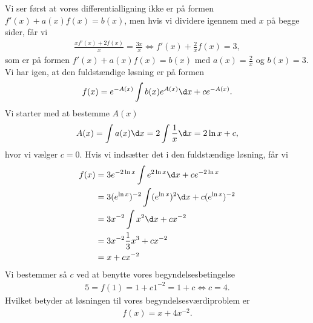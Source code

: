 \begin{enumerate}
Vi ser først at vores differentialligning ikke er på formen $f'(x)+a(x)f(x)=b(x)$, men hvis vi dividere igennem med $x$ på begge sider, får vi
\begin{align*}
\frac{x f'(x) + 2f(x)}{x} = \frac{3x}{x} \Leftrightarrow f'(x) + \frac{2}{x}f(x) = 3,
\end{align*}
som er på formen $f'(x)+a(x)f(x)=b(x)$ med $a(x)=\frac{2}{x}$ og $b(x)=3$. Vi har igen, at den fuldstændige løsning er på formen 
\begin{align*}
f(x)=e^{-A(x)} \int b(x) e^{A(x)} \d x + ce^{-A(x)}.
\end{align*}
Vi starter med at bestemme $A(x)$
\begin{align*}
A(x) = \int a(x) \d x = 2\int \frac{1}{x} \d x =2 \ln x + c, 
\end{align*}
hvor vi vælger $c=0$. Hvis vi indsætter det i den fuldstændige løsning, får vi
\begin{align*}
f(x)&=3e^{-2\ln x} \int e^{2\ln x} \d x + ce^{-2\ln x} \\
&=3(e^{\ln x})^{-2} \int (e^{\ln x})^2 \d x + c(e^{\ln x})^{-2} \\
&=3x^{-2} \int x^2 \d x + cx^{-2} \\
&= 3x^{-2} \frac{1}{3}x^3 + cx^{-2} \\
&= x + cx^{-2}
\end{align*}
Vi bestemmer så $c$ ved at benytte vores begyndelsesbetingelse
\begin{align*}
5=f(1) = 1+c 1^{-2} = 1+c \Leftrightarrow c=4.
\end{align*}
Hvilket betyder at løsningen til vores begyndelsesværdiproblem er 
\begin{align*}
f(x)=x+4x^{-2}.
\end{align*}
\end{enumerate}






